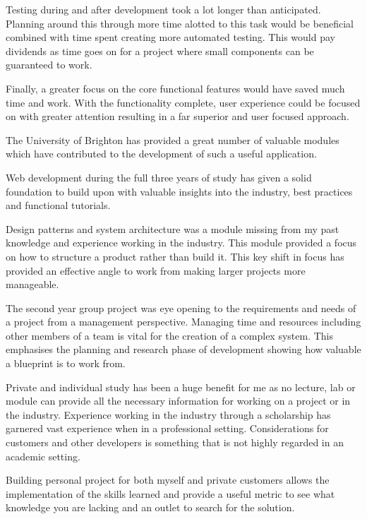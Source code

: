 Testing during and after development took a lot longer than anticipated. Planning around this through more time alotted to this task would be beneficial combined with time spent creating more automated testing. This would pay dividends as time goes on for a project where small components can be guaranteed to work.

Finally, a greater focus on the core functional features would have saved much time and work. With the functionality complete, user experience could be focused on with greater attention resulting in a far superior and user focused approach.

The University of Brighton has provided a great number of valuable modules which have contributed to the development of such a useful application. 

Web development during the full three years of study has given a solid foundation to build upon with valuable insights into the industry, best practices and functional tutorials.

Design patterns and system architecture was a module missing from my past knowledge and experience working in the industry. This module provided a focus on how to structure a product rather than build it. This key shift in focus has provided an effective angle to work from making larger projects more manageable.

The second year group project was eye opening to the requirements and needs of a project from a management perspective. Managing time and resources including other members of a team is vital for the creation of a complex system. This emphasises the planning and research phase of development showing how valuable a blueprint is to work from.

Private and individual study has been a huge benefit for me as no lecture, lab or module can provide all the necessary information for working on a project or in the industry. Experience working in the industry through a scholarship has garnered vast experience when in a professional setting. Considerations for customers and other developers is something that is not highly regarded in an academic setting.

Building personal project for both myself and private customers allows the implementation of the skills learned and provide a useful metric to see what knowledge you are lacking and an outlet to search for the solution.


